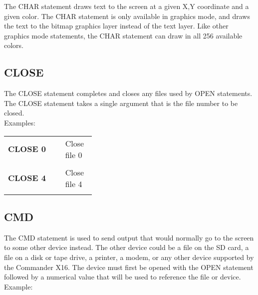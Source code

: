 The {\ttfamily CHAR} statement draws text to the screen at a given X,Y
coordinate and a given color.  The {\ttfamily CHAR} statement is only available
in graphics mode, and draws the text to the bitmap graphics layer instead of
the text layer.  Like other graphics mode statements, the {\ttfamily CHAR}
statement can draw in all 256 available colors.\\


\subsection{CLOSE}

The {\ttfamily CLOSE} statement completes and closes any files used by
{\ttfamily OPEN} statements.  The {\ttfamily CLOSE} statement takes a single
argument that is the file number to be closed.\\

Examples:\\

\begin{tabular}{l p{0.35\linewidth}}

	{\ttfamily\bfseries CLOSE 0}&Close file 0\\\\

	{\ttfamily\bfseries CLOSE 4}&Close file 4\\\\

\end{tabular}

\subsection{CMD}

The {\ttfamily CMD} statement is used to send output that would normally go to
the screen to some other device instead.  The other device could be a file on
the SD card, a file on a disk or tape drive, a printer, a modem, or any other
device supported by the Commander X16.  The device must first be opened with
the {\ttfamily OPEN} statement followed by a numerical value that will be used
to reference the file or device.\\

Example:\\

